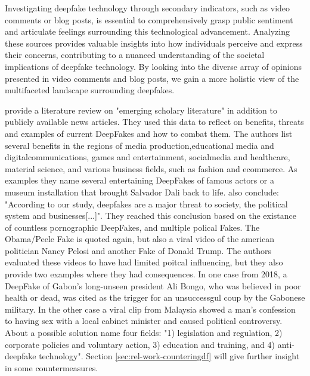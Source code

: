 \documentclass[
  a4paper,  %
  twoside,  %
  bibliography=totoc,
  headsepline,
  cleardoublepage=empty,
  parskip=half,
  draft=false
]{scrbook}
\begin{document}
Investigating deepfake technology through secondary indicators, such as video comments or blog posts, is essential to comprehensively grasp public sentiment and articulate feelings surrounding this technological advancement. Analyzing these sources provides valuable insights into how individuals perceive and express their concerns, contributing to a nuanced understanding of the societal implications of deepfake technology. By looking into the diverse array of opinions presented in video comments and blog posts, we gain a more holistic view of the multifaceted landscape surrounding deepfakes.

\citet{westerlundEmergenceDeepfakeTechnology2019a} provide a literature review on "emerging scholary literature" in addition to publicly available news articles. They used this data to reflect on benefits, threats and examples of current DeepFakes and how to combat them. The authors list several benefits in the regions of media production,educational media and digitalcommunications, games and entertainment, socialmedia and healthcare, material science, and various business fields, such as fashion and ecommerce. As examples they name several entertaining DeepFakes of famous actors or a museum installation that brought Salvador Dali back to life.  also conclude: "According to our study, deepfakes are a major threat to society, the political system and businesses[...]". They reached this conclusion based on the existance of countless pornographic DeepFakes, and multiple polical Fakes. The Obama/Peele Fake is quoted again, but also a viral video of the american politician Nancy Pelosi and another Fake of Donald Trump. The authors evaluated these videos to have had limited poitcal influencing, but they also provide two examples where they had consequences. In one case from 2018, a DeepFake of Gabon's long-unseen president Ali Bongo, who was believed in poor health or dead, was cited as the trigger for an unsuccessgul coup by the Gabonese military. In the other case a viral clip from Malaysia showed a man's confession to having sex with a local cabinet minister and caused political controversy. \\
About a possible solution  name four fields: "1) legislation and regulation, 2) corporate policies and voluntary action, 3) education and training, and 4) anti-deepfake technology". Section \ref{sec:rel-work-counteringdf} will give further insight in some countermeasures.
\end{document}
